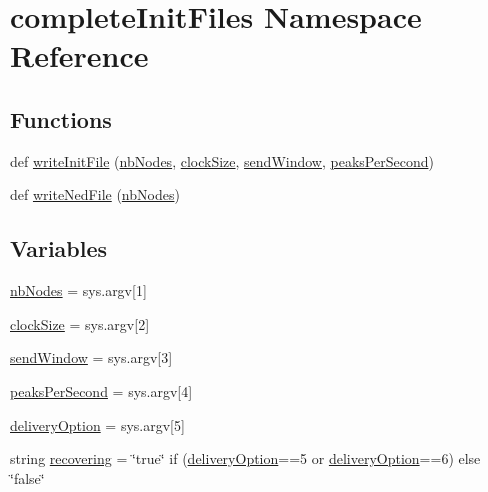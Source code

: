 \hypertarget{namespacecompleteInitFiles}{}\section{complete\+Init\+Files Namespace Reference}
\label{namespacecompleteInitFiles}
\subsection*{Functions}
\begin{DoxyCompactItemize}
\item 
def \hyperlink{namespacecompleteInitFiles_a39c4c9971894ebe40863ef372b026310}{write\+Init\+File} (\hyperlink{namespacecompleteInitFiles_a77675b4c18088100c032bfc8ba7dacc4}{nb\+Nodes}, \hyperlink{namespacecompleteInitFiles_a3a2c2d87e4e87692dc57b17a2d60f034}{clock\+Size}, \hyperlink{namespacecompleteInitFiles_a83b7c92f1a716ef8ff429ccf3516ed52}{send\+Window}, \hyperlink{namespacecompleteInitFiles_a4e58b3d320b917115c4339ce899c3e56}{peaks\+Per\+Second})
\item 
def \hyperlink{namespacecompleteInitFiles_af1f06b5f5a4a0a58b05152bbf4ceb99b}{write\+Ned\+File} (\hyperlink{namespacecompleteInitFiles_a77675b4c18088100c032bfc8ba7dacc4}{nb\+Nodes})
\end{DoxyCompactItemize}
\subsection*{Variables}
\begin{DoxyCompactItemize}
\item 
\hyperlink{namespacecompleteInitFiles_a77675b4c18088100c032bfc8ba7dacc4}{nb\+Nodes} = sys.\+argv\mbox{[}1\mbox{]}
\item 
\hyperlink{namespacecompleteInitFiles_a3a2c2d87e4e87692dc57b17a2d60f034}{clock\+Size} = sys.\+argv\mbox{[}2\mbox{]}
\item 
\hyperlink{namespacecompleteInitFiles_a83b7c92f1a716ef8ff429ccf3516ed52}{send\+Window} = sys.\+argv\mbox{[}3\mbox{]}
\item 
\hyperlink{namespacecompleteInitFiles_a4e58b3d320b917115c4339ce899c3e56}{peaks\+Per\+Second} = sys.\+argv\mbox{[}4\mbox{]}
\item 
\hyperlink{namespacecompleteInitFiles_aac9768ead8049afb94f9fa0efd6a4e6b}{delivery\+Option} = sys.\+argv\mbox{[}5\mbox{]}
\item 
string \hyperlink{namespacecompleteInitFiles_a934c5e5e67b40a7a823ad8c418860dd6}{recovering} = \char`\"{}true\char`\"{} if (\hyperlink{namespacecompleteInitFiles_aac9768ead8049afb94f9fa0efd6a4e6b}{delivery\+Option}==\textquotesingle{}5\textquotesingle{} or \hyperlink{namespacecompleteInitFiles_aac9768ead8049afb94f9fa0efd6a4e6b}{delivery\+Option}==\textquotesingle{}6\textquotesingle{}) else \char`\"{}false\char`\"{}
\end{DoxyCompactItemize}



